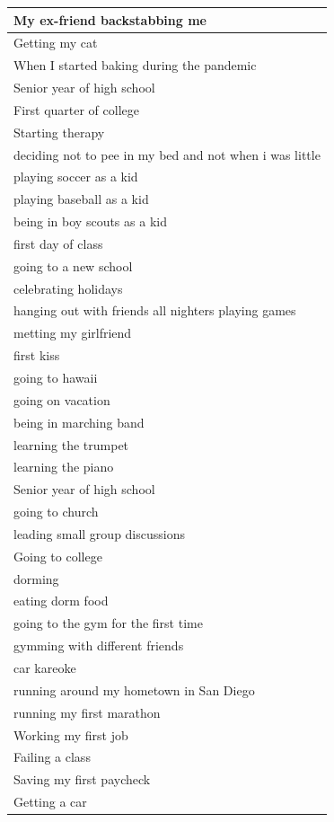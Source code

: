 \documentclass[
  .7em,
  letterpaper,
  DIV=11,
  numbers=noendperiod]{scrartcl}
\begin{document}
\begin{table}
\begin{tabular}{l}
\hline
My ex-friend backstabbing me\\
\hline
Getting my cat\\
\hline
When I started baking during the pandemic\\
\hline
Senior year of high school\\
\hline
First quarter of college\\
\hline
Starting therapy\\
\hline
deciding not to pee in my bed and not when i was little\\
\hline
playing soccer as a kid\\
\hline
playing baseball as a kid\\
\hline
being in boy scouts as a kid\\
\hline
first day of class\\
\hline
going to a new school\\
\hline
celebrating holidays\\
\hline
hanging out with friends all nighters playing games\\
\hline
metting my girlfriend\\
\hline
first kiss\\
\hline
going to hawaii\\
\hline
going on vacation\\
\hline
being in marching band\\
\hline
learning the trumpet\\
\hline
learning the piano\\
\hline
Senior year of high school\\
\hline
going to church\\
\hline
leading small group discussions\\
\hline
Going to college\\
\hline
dorming\\
\hline
eating dorm food\\
\hline
going to the gym for the first time\\
\hline
gymming with different friends\\
\hline
car kareoke\\
\hline
running around my hometown in San Diego\\
\hline
running my first marathon\\
\hline
Working my first job\\
\hline
Failing a class\\
\hline
Saving my first paycheck\\
\hline
Getting a car\\

\end{tabular}
\end{table}
\end{document}
